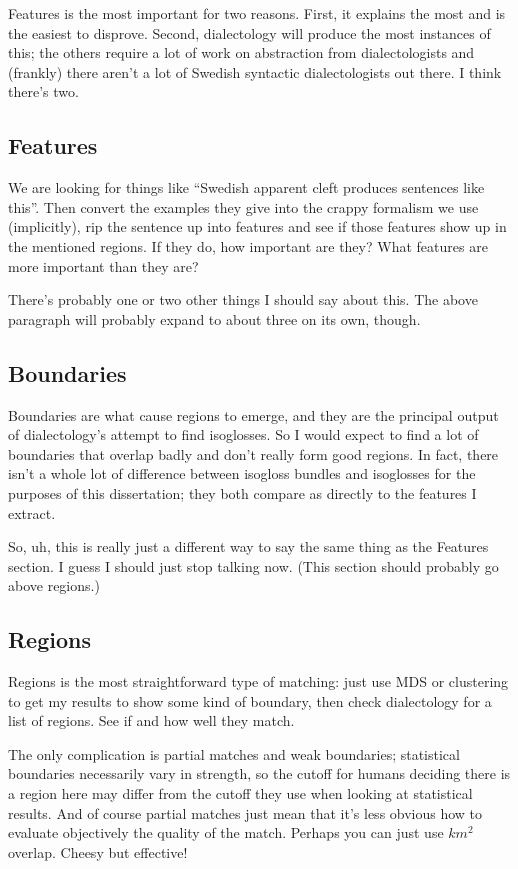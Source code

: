Features is the most important for two reasons. First, it explains the
most and is the easiest to disprove. Second, dialectology will
produce the most instances of this; the others require a lot of work
on abstraction from dialectologists and (frankly) there aren't a lot
of Swedish syntactic dialectologists out there. I think there's two.

\subsection{Features}

We are looking for things like ``Swedish apparent cleft produces
sentences like this''. Then convert the examples they give into the
crappy formalism we use (implicitly), rip the sentence up into
features and see if those features show up in the mentioned
regions. If they do, how important are they? What features are more
important than they are?

There's probably one or two other things I should say about this. The
above paragraph will probably expand to about three on its own,
though.

\subsection{Boundaries}

Boundaries are what cause regions to emerge, and they are the
principal output of dialectology's attempt to find isoglosses. So I
would expect to find a lot of boundaries that overlap badly and don't
really form good regions. In fact, there isn't a whole lot of
difference between isogloss bundles and isoglosses for the purposes of
this dissertation; they both compare as directly to the features I
extract.

So, uh, this is really just a different way to say the same thing as
the Features section. I guess I should just stop talking now. (This
section should probably go above regions.)

\subsection{Regions}

Regions is the most straightforward type of matching: just use MDS or
clustering to get my results to show some kind of boundary, then check
dialectology for a list of regions. See if and how well they match.

The only complication is partial matches and weak boundaries;
statistical boundaries necessarily vary in strength, so the cutoff for
humans deciding there is a region here may differ from the cutoff they
use when looking at statistical results. And of course partial matches
just mean that it's less obvious how to evaluate objectively the
quality of the match. Perhaps you can just use $km^2$ overlap. Cheesy
but effective!

